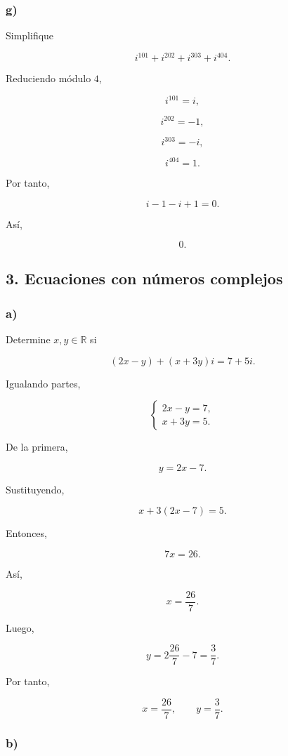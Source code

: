 \documentclass[12pt]{article}
\begin{document}
\subsubsection*{g)}

Simplifique

\[
i^{101}+i^{202}+i^{303}+i^{404}.
\]

Reduciendo módulo \(4\),

\[
i^{101}=i,
\]

\[
i^{202}=-1,
\]

\[
i^{303}=-i,
\]

\[
i^{404}=1.
\]

Por tanto,

\[
i-1-i+1=0.
\]

Así,

\[
\boxed{0}.
\]

\subsection*{3. Ecuaciones con números complejos}

\subsubsection*{a)}

Determine \(x,y\in\mathbb R\) si

\[
(2x-y)+(x+3y)i=7+5i.
\]

Igualando partes,

\[
\begin{cases}
2x-y=7,\\
x+3y=5.
\end{cases}
\]

De la primera,

\[
y=2x-7.
\]

Sustituyendo,

\[
x+3(2x-7)=5.
\]

Entonces,

\[
7x=26.
\]

Así,

\[
x=\frac{26}{7}.
\]

Luego,

\[
y
=
2\frac{26}{7}-7
=
\frac{3}{7}.
\]

Por tanto,

\[
\boxed{
x=\frac{26}{7},
\qquad
y=\frac37
}.
\]

\subsubsection*{b)}
\end{document}
